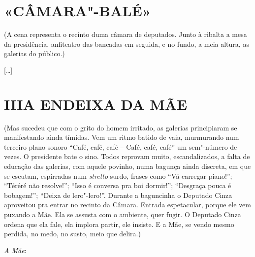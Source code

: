 \section*{«CÂMARA"-BALÉ»}

\hfill\parbox{240pt}{(A cena representa o recinto duma câmara de
deputados. Junto à ribalta a mesa da
presidência, anfiteatro das bancadas em
seguida, e no fundo, a meia altura, as galerias do público.)}

{[}\ldots{}{]}

\section*{III\break A ENDEIXA DA MÃE}

\hfill\parbox{240pt}{
(Mas sucedeu que com o grito do homem irritado, as galerias principiaram
se manifestando ainda tímidas. Vem um ritmo batido de vaia, murmurando
num terceiro plano sonoro ``Café, café, café -- Café, café, café'' um
sem"-número de vezes. O presidente bate o sino. Todos reprovam muito,
escandalizados, a falta de educação das galerias, com aquele povinho,
numa bagunça ainda discreta, em que se escutam, espirradas num
\emph{stretto} surdo, frases como ``Vá carregar piano!''; ``Téréré não
resolve!''; ``Isso é conversa pra boi dormir!''; ``Desgraça pouca é
bobagem!''; ``Deixa de lero"-lero!''. Durante a baguncinha o Deputado
Cinza aproveitou pra entrar no recinto da Câmara. Entrada espetacular,
porque ele vem puxando a Mãe. Ela se assusta com o ambiente, quer fugir.
O Deputado Cinza ordena que ela fale, ela implora partir, ele insiste. E
a Mãe, se vendo mesmo perdida, no medo, no susto, meio que delira.)
}

\bigskip

\emph{A Mãe}:

